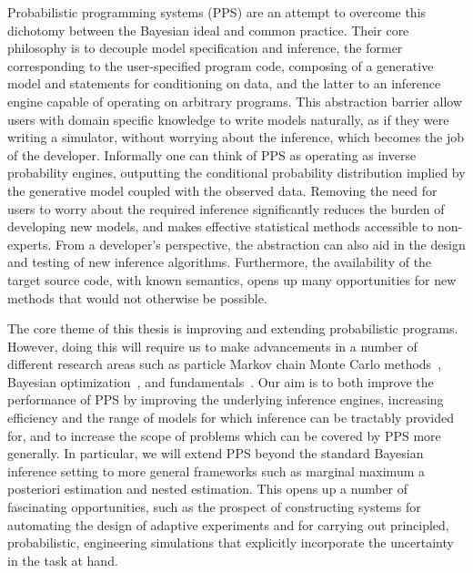 
Probabilistic programming systems (PPS) \cite{carpenter2015stan,wood2014new} are an attempt to
overcome this dichotomy between the Bayesian ideal and common practice.  Their core philosophy 
is to decouple model specification and inference, the former corresponding to the user-specified 
program code, composing of a generative model and statements for conditioning on data, and the 
latter to an inference engine capable of operating on arbitrary programs.  This abstraction barrier 
allow users with domain specific knowledge to write models naturally, as if they were writing a 
simulator, without worrying about the inference, which becomes the job of the developer. Informally 
one can think of PPS as operating as inverse probability engines, outputting the conditional 
probability distribution implied by the generative model coupled with the observed data.
Removing the need for users to worry about the required inference significantly reduces the 
burden of developing new models, and makes effective statistical methods accessible to 
non-experts.  From a developer's perspective, the abstraction can also aid in the design 
and testing of new inference algorithms.  Furthermore, the availability of the target source 
code, with known semantics, opens up many opportunities for new methods that would
not otherwise be possible.

The core theme of this thesis is improving and extending probabilistic programs.  However,
doing this will require us to make advancements in a number of different research areas such
as particle Markov chain Monte Carlo methods~\citep{andrieu2010particle,rainforth2016interacting},
Bayesian optimization~\citep{movckus1975bayesian,rainforth2016bayesian}, and \mc
fundamentals~\cite{metropolis1949monte,rainforth2016pitfalls}.  Our aim is to both improve
the performance of PPS by improving the underlying inference engines, increasing
efficiency and the range of models for which inference can be tractably provided for, and to increase
the scope of problems which can be covered by PPS more generally.  In particular, we
will extend PPS beyond the standard Bayesian inference setting to more general frameworks
such as marginal maximum a posteriori estimation and nested estimation.  This opens up a number
of fascinating opportunities, such as the prospect of constructing systems for automating the
design of adaptive experiments and for carrying out principled, probabilistic, engineering simulations
that explicitly incorporate the uncertainty in the task at hand.